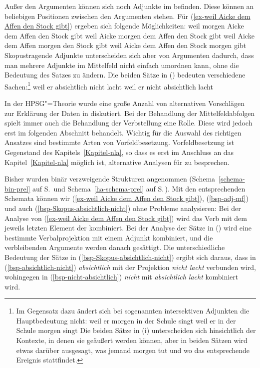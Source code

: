 Außer den Argumenten können sich noch Adjunkte im \mf befinden. Diese können
an beliebigen Positionen zwischen den Argumenten stehen. Für (\ref{ex-weil Aicke dem Affen den Stock gibt}) ergeben
sich \zb folgende Möglichkeiten:
\eal
\label{bsp-adj-mf}
\ex weil morgen Aicke dem Affen den Stock gibt
\ex weil Aicke morgen dem Affen den Stock gibt
\ex weil Aicke dem Affen morgen den Stock gibt
\ex weil Aicke dem Affen den Stock morgen gibt
\zl
Skopustragende Adjunkte unterscheiden sich aber von Argumenten dadurch, dass man mehrere
Adjunkte im Mittelfeld nicht einfach umordnen kann, ohne die Bedeutung des Satzes zu ändern.
Die beiden Sätze in () bedeuten verschiedene Sachen:\footnote{
  Im Gegensatz dazu ändert sich bei sogenannten intersektiven Adjunkten die Hauptbedeutung nicht:
\eal
\ex weil er morgen in der Schule singt
\ex weil er in der Schule morgen singt
\zl
Die beiden Sätze in (i) unterscheiden sich hinsichtlich der Kontexte, in denen sie geäußert
werden können, aber in beiden Sätzen wird etwas darüber ausgesagt, was jemand morgen tut und wo
das entsprechende Ereignis stattfindet.%
}
\eal{}
\label{bsp-Skopus-absichtlich-nicht}
\ex
\label{bsp-absichtlich-nicht}
weil er absichtlich nicht lacht
\ex\label{bsp-nicht-absichtlich}
weil er nicht absichtlich lacht
\zl

\noindent
In der HPSG"=Theorie wurde eine große Anzahl von alternativen Vorschlägen zur Erklärung der
Daten in  diskutiert. Bei der Behandlung der Mittelfeldabfolgen
spielt immer auch die Behandlung der Verbstellung eine Rolle. Diese wird jedoch erst im
folgenden Abschnitt behandelt. Wichtig für die Auswahl des richtigen Ansatzes sind
bestimmte Arten von Vorfeldbesetzung. Vorfeldbesetzung ist Gegenstand des Kapitels~\ref{Kapitel-nla},
so dass es erst im Anschluss an das Kapitel~\ref{Kapitel-nla} möglich ist, alternative
Analysen für  zu besprechen.

Bisher wurden binär verzweigende Strukturen angenommen (Schema~\ref{schema-bin-prel} auf
S.\,\pageref{schema-bin-prel} und Schema~\ref{ha-schema-prel} auf S.\,\pageref{ha-schema-prel}).
Mit den entsprechenden Schemata können wir (\ref{ex-weil Aicke dem Affen den Stock gibt}), (\ref{bsp-adj-mf}) und auch (\ref{bsp-Skopus-absichtlich-nicht})
ohne Probleme analysieren: Bei der Analyse von (\ref{ex-weil Aicke dem Affen den Stock gibt}) wird das Verb mit dem jeweils
letzten Element der \compsl kombiniert. Bei der Analyse der Sätze in ()
wird eine bestimmte Verbalprojektion mit einem Adjunkt kombiniert, und die verbleibenden
Argumente werden danach gesättigt. Die unterschiedliche Bedeutung der Sätze in (\ref{bsp-Skopus-absichtlich-nicht})
ergibt sich daraus, dass in (\ref{bsp-absichtlich-nicht}) \emph{absichtlich} mit der Projektion \emph{nicht lacht} verbunden
wird, wohingegen in (\ref{bsp-nicht-absichtlich}) \emph{nicht} mit \emph{absichtlich lacht} kombiniert wird.

